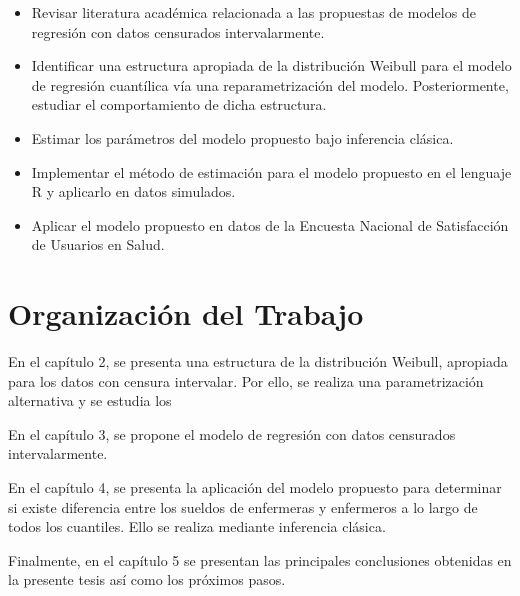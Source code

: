 \begin{itemize}
	\item Revisar literatura académica relacionada a las propuestas de modelos de regresión con datos censurados intervalarmente.
	\item Identificar una estructura apropiada de la distribución Weibull para el modelo de regresión cuantílica vía una reparametrización del modelo. Posteriormente, estudiar el comportamiento de dicha estructura.
	\item Estimar los parámetros del modelo propuesto bajo inferencia clásica.
	\item Implementar el método de estimación para el modelo propuesto en el lenguaje R y aplicarlo en datos simulados.
	\item Aplicar el modelo propuesto en datos de la Encuesta Nacional de Satisfacción de Usuarios en Salud.
\end{itemize}

\section{Organización del Trabajo}

En el capítulo 2, se presenta una estructura de la distribución Weibull, apropiada para los datos con censura intervalar. Por ello, se realiza una parametrización alternativa y se estudia los 

En el capítulo 3, se propone el modelo de regresión con datos censurados intervalarmente.

En el capítulo 4, se presenta la aplicación del modelo propuesto para determinar si existe diferencia entre los sueldos de enfermeras y enfermeros a lo largo de todos los cuantiles. Ello se realiza mediante inferencia clásica.

Finalmente, en el capítulo 5 se presentan las principales conclusiones obtenidas en la presente tesis así como los próximos pasos.